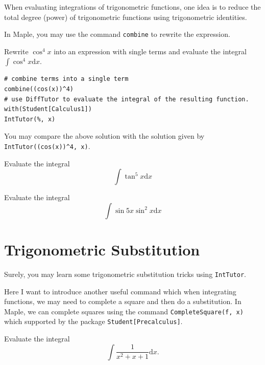 \documentclass[en,11pt,simple]{elegantbook}
\let\BeginKnitrBlock\begin \let\EndKnitrBlock\end
\begin{document}
When evaluating integrations of trigonometric functions, one idea is to reduce the total degree (power) of trigonometric functions using trigonometric identities.

In Maple, you may use the command \texttt{combine} to rewrite the expression.

\BeginKnitrBlock{example}{}{}
\protect\hypertarget{exm:unnamed-chunk-200}{}{\label{exm:unnamed-chunk-200} }
Rewrite \(\cos^4x\) into an expression with single terms and evaluate the integral \(\int \cos^4x\mathrm{d} x\).
\EndKnitrBlock{example}

\BeginKnitrBlock{solution}{}{}
{}

\begin{verbatim}
# combine terms into a single term
combine((cos(x))^4)
# use DiffTutor to evaluate the integral of the resulting function.
with(Student[Calculus1])
IntTutor(%, x)
\end{verbatim}
\EndKnitrBlock{solution}

You may compare the above solution with the solution given by \texttt{IntTutor((cos(x))\^{}4,\ x)}.

\BeginKnitrBlock{exercise}{}{}
\protect\hypertarget{exr:unnamed-chunk-202}{}{\label{exr:unnamed-chunk-202} }
Evaluate the integral
\[
\int \tan ^{5} x \mathrm{d} x
\]
\EndKnitrBlock{exercise}

\BeginKnitrBlock{exercise}{}{}
\protect\hypertarget{exr:unnamed-chunk-203}{}{\label{exr:unnamed-chunk-203} }
Evaluate the integral
\[
\int \sin 5 x \sin^2 x \mathrm{d} x
\]
\EndKnitrBlock{exercise}

\hypertarget{trigonometric-substitution}{%
\section{Trigonometric Substitution}\label{trigonometric-substitution}}

Surely, you may learn some trigonometric substitution tricks using \texttt{IntTutor}.

Here I want to introduce another useful command which when integrating functions, we may need to complete a square and then do a substitution. In Maple, we can complete squares using the command \texttt{CompleteSquare(f,\ x)} which supported by the package \texttt{Student{[}Precalculus{]}}.

\BeginKnitrBlock{example}{}{}
\protect\hypertarget{exm:unnamed-chunk-204}{}{\label{exm:unnamed-chunk-204} }
Evaluate the integral
\[
\int\dfrac{1}{x^2+x+1} \mathrm{d} x.
\]
\EndKnitrBlock{example}
\end{document}
